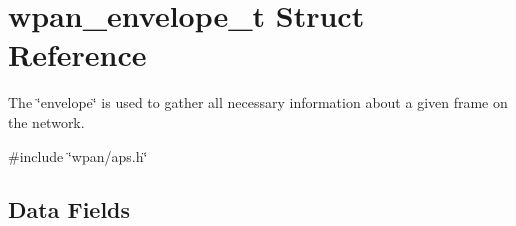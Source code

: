 \hypertarget{structwpan__envelope__t}{}\section{wpan\+\_\+envelope\+\_\+t Struct Reference}
\label{structwpan__envelope__t}


The \char`\"{}envelope\char`\"{} is used to gather all necessary information about a given frame on the network.  




{\ttfamily \#include \char`\"{}wpan/aps.\+h\char`\"{}}

\subsection*{Data Fields}
